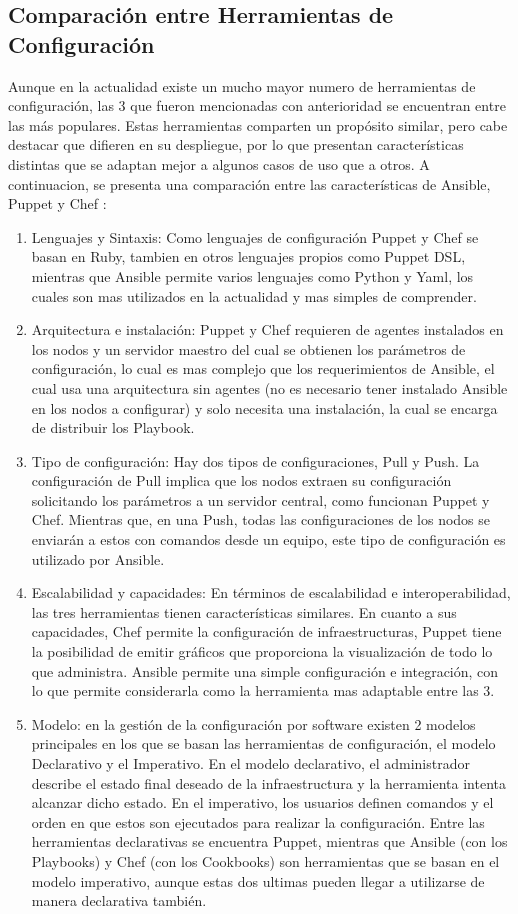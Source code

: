 \subsection{Comparación entre Herramientas de Configuración}
\par Aunque en la actualidad existe un mucho mayor numero de herramientas de configuración, las 3 que fueron mencionadas  con anterioridad se encuentran entre las m\'as populares. Estas herramientas comparten un propósito similar, pero cabe destacar que difieren en su despliegue, por lo que presentan características distintas que se adaptan mejor a algunos casos de uso que a otros. A continuacion, se presenta una comparación entre las características de Ansible, Puppet y Chef \cite{BOOK13,BOOK15,BOOK16}:
\begin{enumerate}
    \item Lenguajes y Sintaxis: Como lenguajes de configuración Puppet y Chef se basan en Ruby, tambien en otros lenguajes propios como Puppet DSL, mientras que Ansible permite varios lenguajes como Python y Yaml, los cuales son mas utilizados en la actualidad y mas simples de comprender.
    \item Arquitectura e instalación: Puppet y Chef requieren de agentes instalados en los nodos y un servidor maestro del cual se obtienen los parámetros de configuración, lo cual es mas complejo que los requerimientos de Ansible, el cual usa una arquitectura sin agentes (no es necesario tener instalado Ansible en los nodos a configurar) y solo necesita una instalación, la cual se encarga de distribuir los Playbook.
    \item Tipo de configuración: Hay dos tipos de configuraciones, Pull y Push. La configuración de Pull implica que los nodos extraen su configuración solicitando los parámetros  a un servidor central, como funcionan Puppet y Chef. Mientras que, en una Push, todas las configuraciones de los nodos se enviarán a estos con comandos desde un equipo, este tipo de configuración es utilizado por Ansible.
    \item Escalabilidad y capacidades:  En términos de escalabilidad e interoperabilidad, las tres herramientas tienen características similares. En cuanto a sus capacidades, Chef permite la configuración de infraestructuras, Puppet tiene la posibilidad  de emitir gráficos que proporciona la visualización de todo lo que administra. Ansible permite una simple configuración e integración, con lo que permite considerarla como la herramienta mas adaptable entre las 3.
    \item Modelo: en la gestión de la configuración por software existen 2 modelos principales en los que se basan las herramientas de configuración, el modelo Declarativo y el Imperativo. En el modelo declarativo, el administrador describe el estado final deseado de la infraestructura y la herramienta intenta alcanzar dicho estado. En el imperativo, los usuarios definen comandos y el orden en que estos son ejecutados para realizar la configuración. Entre las herramientas declarativas se encuentra Puppet, mientras que Ansible (con los Playbooks) y Chef (con los Cookbooks) son herramientas que se basan en el modelo imperativo, aunque estas dos ultimas pueden llegar a utilizarse de manera declarativa también.

\end{enumerate}
